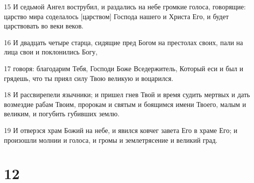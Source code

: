 \par 15 И седьмой Ангел вострубил, и раздались на небе громкие голоса, говорящие: царство мира соделалось [царством] Господа нашего и Христа Его, и будет царствовать во веки веков.
\par 16 И двадцать четыре старца, сидящие пред Богом на престолах своих, пали на лица свои и поклонились Богу,
\par 17 говоря: благодарим Тебя, Господи Боже Вседержитель, Который еси и был и грядешь, что ты приял силу Твою великую и воцарился.
\par 18 И рассвирепели язычники; и пришел гнев Твой и время судить мертвых и дать возмездие рабам Твоим, пророкам и святым и боящимся имени Твоего, малым и великим, и погубить губивших землю.
\par 19 И отверзся храм Божий на небе, и явился ковчег завета Его в храме Его; и произошли молнии и голоса, и громы и землетрясение и великий град.

\chapter{12}


